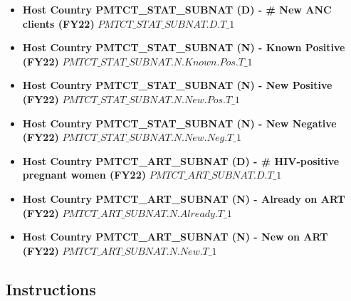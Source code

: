 \documentclass[
  openany]{book}
\begin{document}
\begin{itemize}
\item
  \textbf{Host Country PMTCT\_STAT\_SUBNAT (D) - \# New ANC clients (FY22)}
  \(PMTCT\_STAT\_SUBNAT.D.T\_1\)
\item
  \textbf{Host Country PMTCT\_STAT\_SUBNAT (N) - Known Positive (FY22)}
  \(PMTCT\_STAT\_SUBNAT.N.Known.Pos.T\_1\)
\item
  \textbf{Host Country PMTCT\_STAT\_SUBNAT (N) - New Positive (FY22)}
  \(PMTCT\_STAT\_SUBNAT.N.New.Pos.T\_1\)
\item
  \textbf{Host Country PMTCT\_STAT\_SUBNAT (N) - New Negative (FY22)}
  \(PMTCT\_STAT\_SUBNAT.N.New.Neg.T\_1\)
\item
  \textbf{Host Country PMTCT\_ART\_SUBNAT (D) - \# HIV-positive pregnant women
  (FY22)} \(PMTCT\_ART\_SUBNAT.D.T\_1\)
\item
  \textbf{Host Country PMTCT\_ART\_SUBNAT (N) - Already on ART (FY22)}
  \(PMTCT\_ART\_SUBNAT.N.Already.T\_1\)
\item
  \textbf{Host Country PMTCT\_ART\_SUBNAT (N) - New on ART (FY22)}
  \(PMTCT\_ART\_SUBNAT.N.New.T\_1\)
\end{itemize}

\hypertarget{instructions-13}{%
\subsection{Instructions}\label{instructions-13}}
\end{document}
